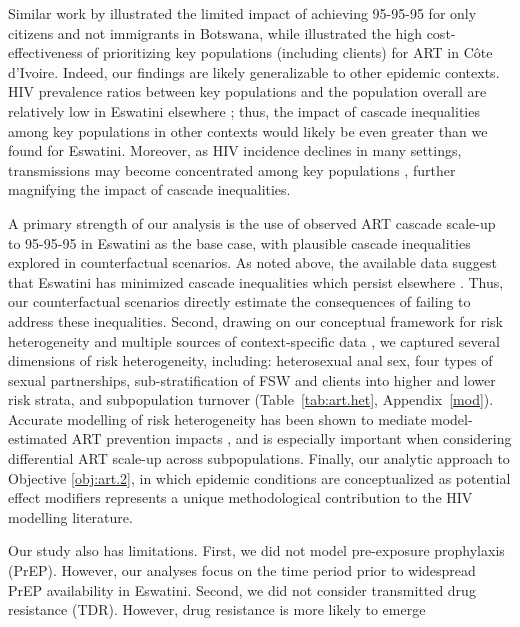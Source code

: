 Similar work by \citet{Marukutira2020} illustrated the limited impact of
achieving 95-95-95 for only citizens and not immigrants in Botswana,
while \citet{Maheu-Giroux2019cost} illustrated the high cost-effectiveness of
prioritizing key populations (including clients) for ART in C\^{o}te d’Ivoire.
Indeed, our findings are likely generalizable to other epidemic contexts.
HIV prevalence ratios between key populations and the population overall
are relatively low in Eswatini \vs elsewhere \cite{Baral2012,Hessou2019};
thus, the impact of cascade inequalities among key populations in other contexts
would likely be even greater than we found for Eswatini.
Moreover, as HIV incidence declines in many settings,
transmissions may become concentrated among key populations \cite{Brown2019,Garnett2021},
further magnifying the impact of cascade inequalities.
\par
A primary strength of our analysis is the use of
observed ART cascade scale-up to 95-95-95 in Eswatini as the base case,
with plausible cascade inequalities explored in counterfactual scenarios.
As noted above, the available data suggest that Eswatini has
minimized cascade inequalities which persist elsewhere \cite{Hakim2018}.
Thus, our counterfactual scenarios directly estimate
the consequences of failing to address these inequalities.
Second, drawing on our conceptual framework for risk heterogeneity \cite[Table~1]{Knight2022sr}
and multiple sources of context-specific data
\cite{SDHS2006,SHIMS1,SHIMS2,Baral2014,EswKP2014,EswIBBS2022},
we captured several dimensions of risk heterogeneity, including:
heterosexual anal sex,
four types of sexual partnerships,
sub-stratification of FSW and clients into higher and lower risk strata,
and subpopulation turnover
(Table~\ref{tab:art.het}, Appendix~\ref{mod}).
Accurate modelling of risk heterogeneity
has been shown to mediate model-estimated ART prevention impacts \cite{Hontelez2013},
and is especially important when considering differential ART scale-up across subpopulations.
Finally, our analytic approach to Objective \ref{obj:art.2},
in which epidemic conditions are conceptualized as potential effect modifiers
represents a unique methodological contribution to the HIV modelling literature.
\par
Our study also has limitations.
First, we did not model pre-exposure prophylaxis (PrEP).
However, our analyses focus on the time period
prior to widespread PrEP availability in Eswatini.
Second, we did not consider transmitted drug resistance (TDR).
However, drug resistance is more likely to emerge
